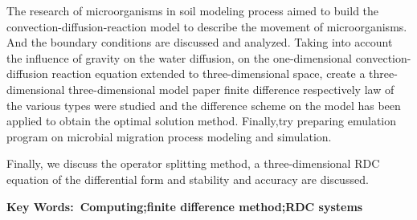 The research of microorganisms in soil modeling process aimed to build the convection-diffusion-reaction model to describe the movement of microorganisms.
And the boundary conditions are discussed and analyzed. Taking into account the influence of gravity
on the water diffusion, on the one-dimensional convection-diffusion reaction equation extended to 
three-dimensional space, create a three-dimensional three-dimensional model paper finite difference 
respectively law of the various types were studied and the difference scheme on the model has been 
applied to obtain the optimal solution method. Finally,try preparing emulation program on microbial
migration process modeling and simulation.\par
Finally, we discuss the operator splitting method, a three-dimensional RDC equation of the differential form and stability and accuracy are discussed.
\vspace*{1.5em}\par
\noindent\textbf{Key Words:~Computing;finite difference method;RDC systems}